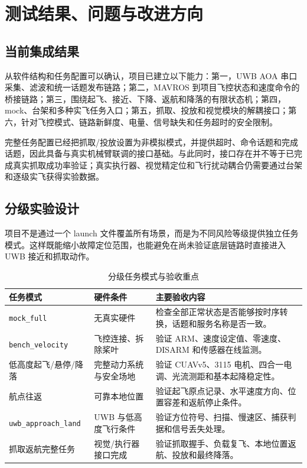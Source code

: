 \documentclass[12pt,a4paper]{ctexart}
\begin{document}
\clearpage
\section{测试结果、问题与改进方向}
\subsection{当前集成结果}
从软件结构和任务配置可以确认，项目已建立以下能力：第一，UWB AOA 串口采集、滤波和统一话题发布链路；第二，MAVROS 到项目飞控状态和速度命令的桥接链路；第三，围绕起飞、接近、下降、返航和降落的有限状态机；第四，mock、台架和多种实飞任务入口；第五，抓取、投放和视觉模块的解耦接口；第六，针对飞控模式、链路新鲜度、电量、信号缺失和任务超时的安全限制。

完整任务配置已经把抓取/投放设置为非模拟模式，并提供超时、命令话题和完成话题，因此具备与真实机械臂联调的接口基础。与此同时，接口存在并不等于已完成真实抓取成功率验证；真实执行器、视觉精定位和飞行扰动耦合仍需要通过台架和逐级实飞获得实验数据。

\subsection{分级实验设计}
项目不是通过一个 launch 文件覆盖所有场景，而是为不同风险等级提供独立任务模式。这样既能缩小故障定位范围，也能避免在尚未验证底层链路时直接进入 UWB 接近和抓取动作。

\begin{table}[htbp]
\centering
\caption{分级任务模式与验收重点}\label{tab:test-modes}
{
\begin{tabular}{p{4.0cm}p{4.0cm}p{5.2cm}}
\hline
任务模式 & 硬件条件 & 主要验收内容 \\
\hline
\texttt{mock\_full} & 无真实硬件 & 检查全部正常状态是否能够按时序转换，话题和服务名称是否一致。\\
\texttt{bench\_velocity} & 飞控连接、拆除桨叶 & 验证 ARM、速度设定值、零速度、DISARM 和传感器在线监测。\\
低高度起飞/悬停/降落 & 完整动力系统与安全场地 & 验证 CUAVv5、3115 电机、四合一电调、光流测距和基本起降稳定性。\\
航点往返 & 可靠本地位置 & 验证起飞原点记录、水平速度方向、位置容差和返航停止条件。\\
\texttt{uwb\_approach\_land} & UWB 与低高度飞行条件 & 验证方位符号、扫描、慢速区、捕获判据和信号丢失处理。\\
抓取返航完整任务 & 视觉/执行器接口完成 & 验证抓取握手、负载复飞、本地位置返航、投放和最终降落。\\
\hline
\end{tabular}
}
\end{table}
\end{document}
